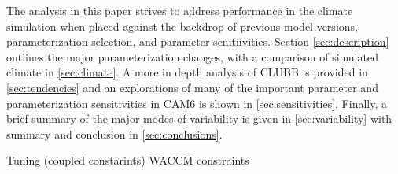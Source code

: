 The analysis in this paper strives to address performance in the climate simulation when placed against the backdrop of previous model versions, parameterization selection, and parameter senitiivities. Section \ref{sec:description} outlines the major parameterization changes, with a comparison of simulated climate in \ref{sec:climate}. A more in depth analysis of CLUBB is provided in \ref{sec:tendencies} and an explorations of many of the important parameter and parameterization sensitivities in CAM6 is shown in \ref{sec:sensitivities}. Finally, a brief summary of the major modes of variability is given in \ref{sec:variability} with summary and conclusion in \ref{sec:conclusions}.


Tuning (coupled constarints)
WACCM constraints
